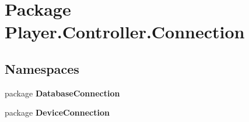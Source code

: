 \section{Package Player.\-Controller.\-Connection}
\label{namespace_player_1_1_controller_1_1_connection}
\subsection*{Namespaces}
\begin{DoxyCompactItemize}
\item 
package {\bf Database\-Connection}
\item 
package {\bf Device\-Connection}
\end{DoxyCompactItemize}
